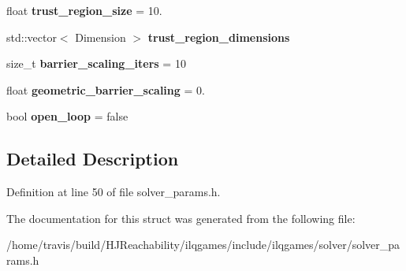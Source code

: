 \begin{DoxyCompactItemize}
\item 
float {\bfseries trust\+\_\+region\+\_\+size} = 10.\hypertarget{structilqgames_1_1_solver_params_af6f8750a857ace4ecb52e85fb7d04021}{}\label{structilqgames_1_1_solver_params_af6f8750a857ace4ecb52e85fb7d04021}

\item 
std\+::vector$<$ Dimension $>$ {\bfseries trust\+\_\+region\+\_\+dimensions}\hypertarget{structilqgames_1_1_solver_params_a5d2025c32b094329c126777e53122a08}{}\label{structilqgames_1_1_solver_params_a5d2025c32b094329c126777e53122a08}

\item 
size\+\_\+t {\bfseries barrier\+\_\+scaling\+\_\+iters} = 10\hypertarget{structilqgames_1_1_solver_params_a0759cbca5370ac06afb2ed3b460ee233}{}\label{structilqgames_1_1_solver_params_a0759cbca5370ac06afb2ed3b460ee233}

\item 
float {\bfseries geometric\+\_\+barrier\+\_\+scaling} = 0.\hypertarget{structilqgames_1_1_solver_params_afe514e86e3439b0b041ce0fda74338bd}{}\label{structilqgames_1_1_solver_params_afe514e86e3439b0b041ce0fda74338bd}

\item 
bool {\bfseries open\+\_\+loop} = false\hypertarget{structilqgames_1_1_solver_params_abb3fe1fbe358304f0c80d75c104bc087}{}\label{structilqgames_1_1_solver_params_abb3fe1fbe358304f0c80d75c104bc087}

\end{DoxyCompactItemize}


\subsection{Detailed Description}


Definition at line 50 of file solver\+\_\+params.\+h.



The documentation for this struct was generated from the following file\+:\begin{DoxyCompactItemize}
\item 
/home/travis/build/\+H\+J\+Reachability/ilqgames/include/ilqgames/solver/solver\+\_\+params.\+h\end{DoxyCompactItemize}
